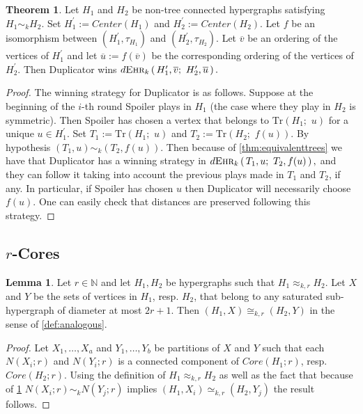 \documentclass[12pt,notitlepage,a4paper]{article}
\theoremstyle{definition}
\newtheorem{theorem}{Theorem}[section]
\newtheorem{lemma}{Lemma}[section]
\newcommand{\N}{\mathbb{N}}
\newcommand{\ehr}{\textsc{Ehr}}
\newcommand{\sep}{\noindent\rule{2cm}{0.4pt}}
\begin{document}
	\begin{theorem} \label{thm:strategyaux}
		Let $H_1$ and $H_2$ be non-tree 
		connected hypergraphs satisfying
		$H_1\sim_k H_2$. 
		Set $H^\prime_1:= Center(H_1)$ and 
		$H^\prime_2:= Center(H_2)$. Let $f$ be an isomorphism
		between $\left( H^\prime_1,\tau_{H_1}\right)$ and 
		$\left(H^\prime_2,\tau_{H_2}\right)$. Let $\overline{v}$ 
		be an ordering of the vertices of $H^\prime_1$ and let
		$\overline{u}:=f(\overline{v})$ be the corresponding
		ordering of the vertices of $H^\prime_2$. Then
		Duplicator wins 
		$	d\ehr_{k}\left(\,
		H^\prime_1,\overline{v};\,\,
		H^\prime_2,\overline{u}\,
		\right).
		$
	\end{theorem}
	\begin{proof}
		The winning strategy for Duplicator is as follows. 
		Suppose at the beginning of the $i$-th round
		Spoiler plays in $H_1$ (the case where they play in
		$H_2$ is symmetric). Then Spoiler has chosen a vertex 
		that belongs to $\mathrm{Tr}(H_1;\,\,u)$ for a unique
		$u\in H^\prime_1$. 
		Set $T_1:=\mathrm{Tr}\left(H_1;\,\,u\right)$ and
		$T_2:=\mathrm{Tr}\left(H_2;\,\,f(u)\right)$.
		By hypothesis
		$(T_1,u)\sim_k (T_2,f(u))$. 
		Then because of \cref{thm:equivalenttrees} we have that
		Duplicator has a winning strategy in
		$
		d\ehr_{k}\left(\,
		T_1,u; \, \, T_2, f(u)\,\right),
		$
		and they can follow it taking into account the previous
		plays made in $T_1$ and $T_2$, if any. In particular, 
		if Spoiler has chosen
		$u$ then Duplicator will necessarily choose $f(u)$.
		One can easily check that distances are preserved
		following this strategy. 
	\end{proof}
		
\subsection{$r$-Cores} \label{sec:Core}




\begin{lemma} \label{lem:aux1}
	Let $r\in \N$ and let $H_1, H_2$ be hypergraphs such that 
	$H_1\approx_{k,r} H_2$. Let $X$ and $Y$ be the
	sets of vertices in $H_1$, resp. $H_2$, that
	belong to any saturated sub-hypergraph of diameter 
	at most $2r+1$. Then $(H_1,X)\cong_{k,r} (H_2,Y)$ in the sense of
	\cref{def:analogous}.
\end{lemma}
\begin{proof}
	Let $X_1,\dots, X_a$ and $Y_1,\dots, Y_b$ be partitions of
	$X$ and $Y$ such that each $N(X_i;r)$ and $N(Y_i;r)$ is 
	a connected component of $Core(H_1;r)$, resp. $Core(H_2;r)$.
	Using the definition of $H_1\approx_{k,r}H_2$ as well 
	as the fact that  because of \cref{thm:strategyaux}
	$N(X_i;r)\sim_k N(Y_j;r)$ implies 
	$(H_1,X_i)\simeq_{k,r} (H_2,Y_j)$
	the result follows.	
\end{proof}
\end{document}
